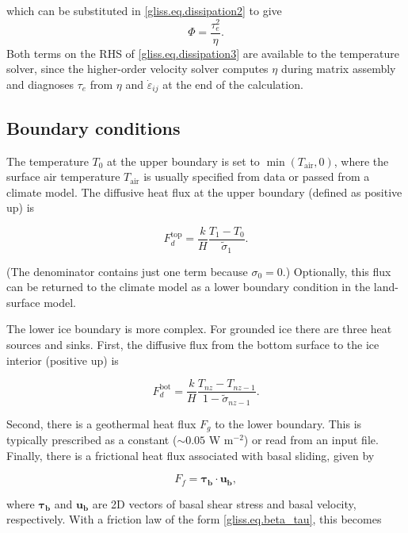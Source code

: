 \noindent
which can be substituted in \eqref{gliss.eq.dissipation2} to give
\begin{equation}
  \label{gliss.eq.dissipation3}
  \Phi = \frac{\tau_e^2}{\eta}.
\end{equation}
%
Both terms on the RHS of \eqref{gliss.eq.dissipation3} are available to the temperature solver,
since the higher-order velocity solver computes $\eta$ during matrix assembly
and diagnoses $\tau_e$ from $\eta$ and $\dot{\varepsilon}_{ij}$ at the end of the calculation.

\subsection{Boundary conditions}
The temperature $T_0$ at the upper boundary is set to $\min(T_\mathrm{air},0)$, 
where the surface air temperature $T_{\mathrm{air}}$ is usually specified from data or passed from a climate model.
The diffusive heat flux at the upper boundary (defined as positive up) is

\begin{equation}
  F_d^{\mathrm{top}} = \frac{k}{H} \frac{T_1 - T_0}{\tilde{\sigma}_1}.
\end{equation}

\noindent
(The denominator contains just one term because $\sigma_0 = 0$.)
Optionally, this flux can be returned to the climate model as a lower boundary
condition in the land-surface model.

The lower ice boundary is more complex. For grounded ice there are three heat sources and sinks.
First, the diffusive flux from the bottom surface to the ice interior 
(positive up) is

\begin{equation}
  F_d^{\mathrm{bot}} = \frac{k}{H} \frac{T_{nz} - T_{nz-1}}{1 - \tilde{\sigma}_{nz-1}}.
\end{equation}

\noindent
Second, there is a geothermal heat flux $F_g$ to the lower boundary. This is typically 
prescribed as a constant ($\sim 0.05$ W m$^{-2}$) or read from an input file.
Finally, there is a frictional heat flux associated with basal sliding,
given by \citep[p. 418]{Cuffey2010}

\begin{equation}
  F_f = \mathbf{\tau_b} \cdot \mathbf{u_b},
\end{equation}

\noindent
where $\mathbf{\tau_b}$ and $\mathbf{u_b}$ are 2D vectors of basal shear stress and basal velocity,
respectively. With a friction law of the form \eqref{gliss.eq.beta_tau}, this becomes

